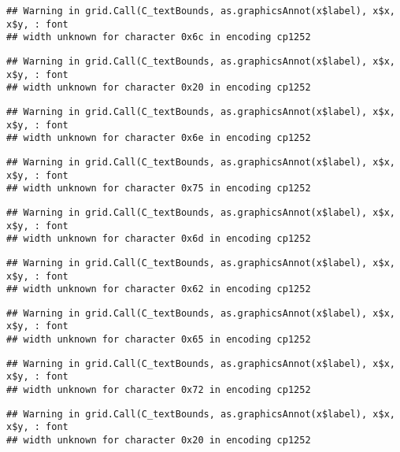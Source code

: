 \documentclass[
]{article}
\begin{document}
\begin{verbatim}
## Warning in grid.Call(C_textBounds, as.graphicsAnnot(x$label), x$x, x$y, : font
## width unknown for character 0x6c in encoding cp1252
\end{verbatim}

\begin{verbatim}
## Warning in grid.Call(C_textBounds, as.graphicsAnnot(x$label), x$x, x$y, : font
## width unknown for character 0x20 in encoding cp1252
\end{verbatim}

\begin{verbatim}
## Warning in grid.Call(C_textBounds, as.graphicsAnnot(x$label), x$x, x$y, : font
## width unknown for character 0x6e in encoding cp1252
\end{verbatim}

\begin{verbatim}
## Warning in grid.Call(C_textBounds, as.graphicsAnnot(x$label), x$x, x$y, : font
## width unknown for character 0x75 in encoding cp1252
\end{verbatim}

\begin{verbatim}
## Warning in grid.Call(C_textBounds, as.graphicsAnnot(x$label), x$x, x$y, : font
## width unknown for character 0x6d in encoding cp1252
\end{verbatim}

\begin{verbatim}
## Warning in grid.Call(C_textBounds, as.graphicsAnnot(x$label), x$x, x$y, : font
## width unknown for character 0x62 in encoding cp1252
\end{verbatim}

\begin{verbatim}
## Warning in grid.Call(C_textBounds, as.graphicsAnnot(x$label), x$x, x$y, : font
## width unknown for character 0x65 in encoding cp1252
\end{verbatim}

\begin{verbatim}
## Warning in grid.Call(C_textBounds, as.graphicsAnnot(x$label), x$x, x$y, : font
## width unknown for character 0x72 in encoding cp1252
\end{verbatim}

\begin{verbatim}
## Warning in grid.Call(C_textBounds, as.graphicsAnnot(x$label), x$x, x$y, : font
## width unknown for character 0x20 in encoding cp1252
\end{verbatim}
\end{document}
